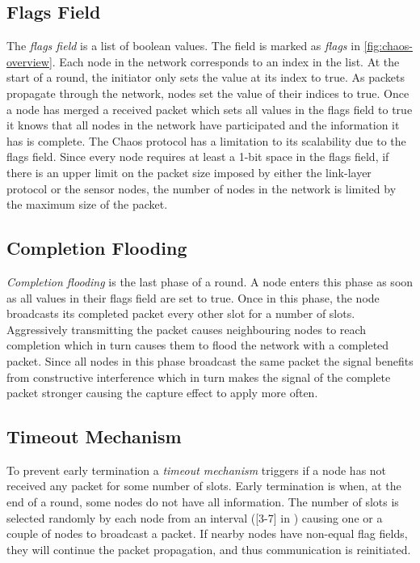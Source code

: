 \subsection{Flags Field}
\label{subsec-flags-field}
The \textit{flags field} is a list of boolean values. The field is marked as \textit{flags} in \cref{fig:chaos-overview}. Each node in the network corresponds to an index in the list. At the start of a round, the initiator only sets the value at its index to true. As packets propagate through the network, nodes set the value of their indices to true. Once a node has merged a received packet which sets all values in the flags field to true it knows that all nodes in the network have participated and the information it has is complete. The Chaos protocol has a limitation to its scalability due to the flags field. Since every node requires at least a 1-bit space in the flags field, if there is an upper limit on the packet size imposed by either the link-layer protocol or the sensor nodes, the number of nodes in the network is limited by the maximum size of the packet. 

\subsection{Completion Flooding} %
\emph{Completion flooding} is the last phase of a round. A node enters this phase as soon as all values in their flags field are set to true. Once in this phase, the node broadcasts its completed packet every other slot for a number of slots. Aggressively transmitting the packet causes neighbouring nodes to reach completion which in turn causes them to flood the network with a completed packet. Since all nodes in this phase broadcast the same packet the signal benefits from constructive interference which in turn makes the signal of the complete packet stronger causing the capture effect to apply more often.

\subsection{Timeout Mechanism}
To prevent early termination a \textit{timeout mechanism} triggers if a node has not received any packet for some number of slots. Early termination is when, at the end of a round, some nodes do not have all information. The number of slots is selected randomly by each node from an interval ([3-7] in \cite{chaos-introduction-paper}) causing one or a couple of nodes to broadcast a packet. If nearby nodes have non-equal flag fields, they will continue the packet propagation, and thus communication is reinitiated.

